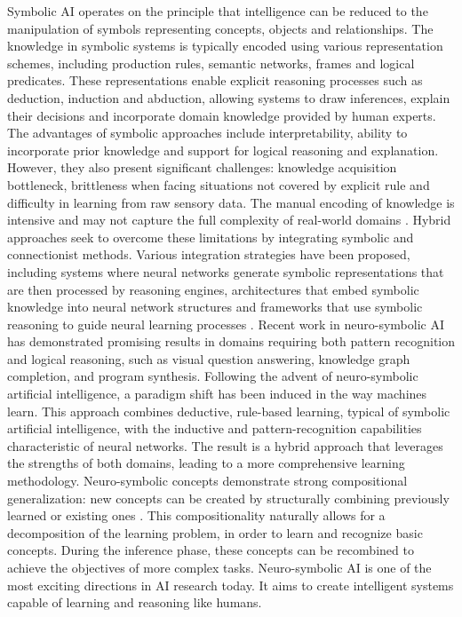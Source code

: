 \documentclass[12pt,a4paper]{report}
\begin{document}
Symbolic AI operates on the principle that intelligence can be reduced to the manipulation of symbols representing concepts, objects and relationships. The knowledge in symbolic systems is typically encoded using various representation schemes, including production rules, semantic networks, frames and logical predicates. These representations enable explicit reasoning processes such as deduction, induction and abduction, allowing systems 
to draw inferences, explain their decisions and incorporate domain knowledge provided by human experts.
The advantages of symbolic approaches include interpretability, ability to incorporate prior knowledge and support for logical reasoning and explanation. However, they also present significant challenges: knowledge acquisition bottleneck, brittleness when facing situations not covered by explicit rule and difficulty in learning from raw sensory data. The manual 
encoding of knowledge is intensive and may not capture the full complexity of real-world domains \cite{chiave16}. 
Hybrid approaches seek to overcome these limitations by integrating symbolic and connectionist methods. 
Various integration strategies have been proposed, including systems where neural networks generate symbolic representations that are then processed by reasoning engines, architectures that embed symbolic knowledge into neural 
network structures and frameworks that use symbolic reasoning to guide neural learning processes \cite{chiave43}. Recent work in neuro-symbolic AI has demonstrated promising results in domains requiring both pattern recognition and logical reasoning, such as visual question answering, knowledge graph completion, and program synthesis.
Following the advent of neuro-symbolic artificial intelligence, a paradigm shift has been induced in the way machines learn. This approach combines deductive, rule-based learning, typical of symbolic artificial intelligence, with the inductive and pattern-recognition capabilities characteristic of neural networks. The result is a hybrid approach that leverages the strengths of both domains, leading to a more comprehensive learning methodology.
Neuro-symbolic concepts demonstrate strong compositional generalization: new concepts can be created by structurally combining previously learned or existing ones  \cite{chiave8}. This compositionality naturally allows for a decomposition of the learning problem, in order to learn and recognize basic concepts. During the inference phase, these concepts can be recombined to achieve the objectives of more complex tasks. Neuro-symbolic AI is one of the 
most exciting directions in AI research today. It aims to create intelligent systems capable of learning and reasoning like humans.
\end{document}
